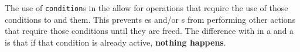 The use of \texttt{condition}s in the  allow for operations that require the use of those conditions to  and  them.
This prevents es and/or s from performing other actions that require those conditions until they are freed.
The difference with  in a  and a  is that if that condition is already active, \textbf{nothing happens}.

